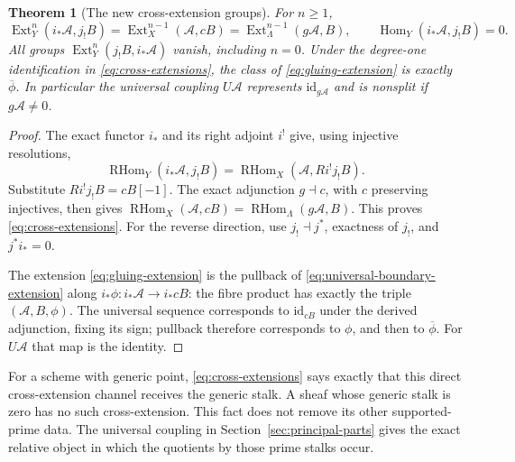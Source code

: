 \documentclass[11pt,a4paper]{article}
\newtheorem{theorem}{Theorem}[section]
\theoremstyle{definition}\newtheorem{definition}[theorem]{Definition}
\providecommand{\Hom}{\operatorname{Hom}}
\providecommand{\Ext}{\operatorname{Ext}}
\providecommand{\RHom}{\operatorname{RHom}}
\begin{document}
\begin{theorem}[The new cross-extension groups]\label{thm:cross-ext}
For $n\ge1$,
\[
 \Ext_Y^n(i_*\mathcal A,j_!B)
 =\Ext_X^{n-1}(\mathcal A,cB)
 =\Ext_\Lambda^{n-1}(g\mathcal A,B),
 \qquad\Hom_Y(i_*\mathcal A,j_!B)=0.
 \tag{RP12}\label{eq:cross-extensions}
\]
All groups $\Ext_Y^n(j_!B,i_*\mathcal A)$ vanish, including $n=0$.
Under the degree-one identification in \eqref{eq:cross-extensions},
the class of \eqref{eq:gluing-extension} is exactly $\overline\phi$.
In particular the universal coupling $U\mathcal A$ represents
$\mathrm{id}_{g\mathcal A}$ and is nonsplit if $g\mathcal A\ne0$.
\end{theorem}
\begin{proof}
The exact functor $i_*$ and its right adjoint $i^!$ give, using injective
resolutions,
\[
\RHom_Y(i_*\mathcal A,j_!B)=\RHom_X(\mathcal A,Ri^!j_!B).
\]
Substitute
$Ri^!j_!B=cB[-1]$. The exact adjunction $g\dashv c$, with $c$ preserving
injectives, then gives
$\RHom_X(\mathcal A,cB)=\RHom_\Lambda(g\mathcal A,B)$.
This proves \eqref{eq:cross-extensions}. For the reverse direction,
use $j_!\dashv j^*$, exactness of $j_!$, and $j^*i_*=0$.

The extension \eqref{eq:gluing-extension} is the pullback of
\eqref{eq:universal-boundary-extension} along
$i_*\phi:i_*\mathcal A\to i_*cB$: the fibre product has exactly the
triple $(\mathcal A,B,\phi)$. The universal sequence corresponds to
$\mathrm{id}_{cB}$ under the derived adjunction, fixing its sign;
pullback therefore corresponds to $\phi$, and then to
$\overline\phi$. For $U\mathcal A$ that map is the identity.
\end{proof}

For a scheme with generic point, \eqref{eq:cross-extensions} says exactly
that this direct cross-extension channel receives the generic stalk.
A sheaf whose generic stalk is zero has no such cross-extension.
This fact does not remove its other supported-prime data. The universal
coupling in Section~\ref{sec:principal-parts} gives the exact relative
object in which the quotients by those prime stalks occur.
\end{document}
